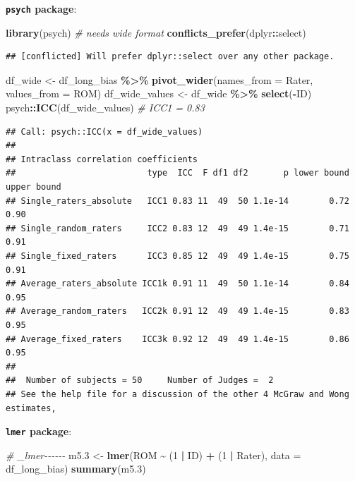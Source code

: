 \documentclass[
]{book}
\newenvironment{Shaded}{\begin{snugshade}}{\end{snugshade}}
\newcommand{\AttributeTok}[1]{\textcolor[rgb]{0.13,0.29,0.53}{#1}}
\newcommand{\CommentTok}[1]{\textcolor[rgb]{0.56,0.35,0.01}{\textit{#1}}}
\newcommand{\DecValTok}[1]{\textcolor[rgb]{0.00,0.00,0.81}{#1}}
\newcommand{\FloatTok}[1]{\textcolor[rgb]{0.00,0.00,0.81}{#1}}
\newcommand{\FunctionTok}[1]{\textcolor[rgb]{0.13,0.29,0.53}{\textbf{#1}}}
\newcommand{\NormalTok}[1]{#1}
\newcommand{\OtherTok}[1]{\textcolor[rgb]{0.56,0.35,0.01}{#1}}
\newcommand{\SpecialCharTok}[1]{\textcolor[rgb]{0.81,0.36,0.00}{\textbf{#1}}}
\begin{document}
\textbf{\texttt{psych} package}:

\begin{Shaded}
\begin{Highlighting}[]
\FunctionTok{library}\NormalTok{(psych)}
\CommentTok{\# needs wide format}
\FunctionTok{conflicts\_prefer}\NormalTok{(dplyr}\SpecialCharTok{::}\NormalTok{select)}
\end{Highlighting}
\end{Shaded}

\begin{verbatim}
## [conflicted] Will prefer dplyr::select over any other package.
\end{verbatim}

\begin{Shaded}
\begin{Highlighting}[]
\NormalTok{df\_wide }\OtherTok{\textless{}{-}}\NormalTok{ df\_long\_bias }\SpecialCharTok{\%\textgreater{}\%}
  \FunctionTok{pivot\_wider}\NormalTok{(}\AttributeTok{names\_from =}\NormalTok{ Rater, }\AttributeTok{values\_from =}\NormalTok{ ROM)}
\NormalTok{df\_wide\_values }\OtherTok{\textless{}{-}}\NormalTok{ df\_wide }\SpecialCharTok{\%\textgreater{}\%} \FunctionTok{select}\NormalTok{(}\SpecialCharTok{{-}}\NormalTok{ID)}
\NormalTok{psych}\SpecialCharTok{::}\FunctionTok{ICC}\NormalTok{(df\_wide\_values) }\CommentTok{\# ICC1 = 0.83}
\end{Highlighting}
\end{Shaded}

\begin{verbatim}
## Call: psych::ICC(x = df_wide_values)
## 
## Intraclass correlation coefficients 
##                          type  ICC  F df1 df2       p lower bound upper bound
## Single_raters_absolute   ICC1 0.83 11  49  50 1.1e-14        0.72        0.90
## Single_random_raters     ICC2 0.83 12  49  49 1.4e-15        0.71        0.91
## Single_fixed_raters      ICC3 0.85 12  49  49 1.4e-15        0.75        0.91
## Average_raters_absolute ICC1k 0.91 11  49  50 1.1e-14        0.84        0.95
## Average_random_raters   ICC2k 0.91 12  49  49 1.4e-15        0.83        0.95
## Average_fixed_raters    ICC3k 0.92 12  49  49 1.4e-15        0.86        0.95
## 
##  Number of subjects = 50     Number of Judges =  2
## See the help file for a discussion of the other 4 McGraw and Wong estimates,
\end{verbatim}

\textbf{\texttt{lmer} package}:

\begin{Shaded}
\begin{Highlighting}[]
\CommentTok{\# \_lmer{-}{-}{-}{-}{-}{-}}
\NormalTok{m5}\FloatTok{.3} \OtherTok{\textless{}{-}} \FunctionTok{lmer}\NormalTok{(ROM }\SpecialCharTok{\textasciitilde{}}\NormalTok{ (}\DecValTok{1} \SpecialCharTok{|}\NormalTok{ ID) }\SpecialCharTok{+}\NormalTok{ (}\DecValTok{1} \SpecialCharTok{|}\NormalTok{ Rater), }\AttributeTok{data =}\NormalTok{ df\_long\_bias)}
\FunctionTok{summary}\NormalTok{(m5}\FloatTok{.3}\NormalTok{)}
\end{Highlighting}
\end{Shaded}
\end{document}
